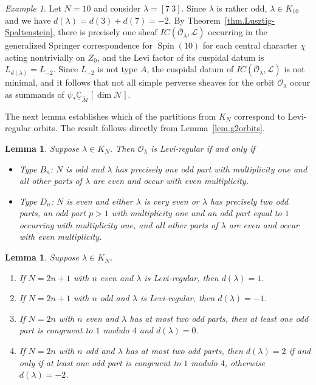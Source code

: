 \documentclass[reqno,11pt]{amsart}
\newtheorem{Lem}[Thm]{Lemma}
\theoremstyle{remark}
\theoremstyle{remark}
\newtheorem{example}[Thm]{Example}
\theoremstyle{definition}
\theoremstyle{definition}
\theoremstyle{definition}
\numberwithin{equation}{section}
\newcommand{\C}{\mathbb{C}}           %
\newcommand{\Spin}{\operatorname{Spin}}
\newcommand{\cl}{\mathcal{L}}
\newcommand{\cm}{\mathcal{M}}
\newcommand{\cn}{\mathcal{N}}
\newcommand{\co}{\mathcal{O}}
\newcommand{\shc}{\underline{\C}}
\renewcommand{\tilde}{\widetilde}
\begin{document}
\begin{example}\label{ex.Spin10} Let $N=10$ and consider $\lambda = [7 \ 3]$. Since $\lambda$ is rather odd, $\lambda\in K_{10}$ and we have $d(\lambda) = d(3)+d(7) = -2$. By Theorem~\ref{thm.Lusztig-Spaltenstein}, there is precisely one sheaf $IC(\overline{\co}_\lambda, \cl)$ occurring in the generalized Springer correspondence for $\Spin(10)$ for each central character $\chi$ acting nontrivially on $Z_0$, and the Levi factor of its cuspidal datum is $L_{d(\lambda)} =L_{-2}$. Since $L_{-2}$ is not type $A$, the cuspidal datum of $IC(\overline{\co}_\lambda, \cl)$ is not minimal, and it follows that not all simple perverse sheaves for the orbit $\co_\lambda$ occur as summands of $\psi_*\shc_{\tilde{\cm}}[\dim \cn]$. 
\end{example}



The next lemma establishes which of the partitions from $K_N$ correspond to Levi-regular orbits. The result follows directly from Lemma~\ref{lem.g2orbits}.

\begin{Lem}\label{Lem:partitionxn}
Suppose $\lambda\in K_N$. Then $\co_\lambda$ is Levi-regular if and only if 
\begin{itemize}
\item \textup{Type $B_n$:}  $N$ is odd and $\lambda$ has precisely one odd part with multiplicity one and all other parts of $\lambda$ are even and occur with even multiplicity.
\item \textup{Type $D_n$:}  $N$ is even and either $\lambda$ is very even or  $\lambda$ has precisely two odd parts, an odd part $p > 1$ with multiplicity one and an odd part equal to $1$ occurring with multiplicity one, and all other parts of $\lambda$ are even and occur with even multiplicity.
\end{itemize}
\end{Lem}



\begin{Lem}\label{lem.spinsoln}
Suppose $\lambda \in K_N$.  
\begin{enumerate}
\item If $N = 2n+1$ with $n$ even and $\lambda$ is Levi-regular, then $d(\lambda) = 1$.
\item If $N = 2n+1$ with $n$ odd and $\lambda$ is Levi-regular, then $d(\lambda) = -1$. 
\item If $N = 2n$ with $n$ even and $\lambda$ has at most two odd parts, then at least one odd part is congruent to $1$ modulo $4$ and  $d(\lambda) = 0$.
\item If $N = 2n$ with $n$ odd and $\lambda$ has at most two odd parts, then $d(\lambda) = 2$ if and only if at least one odd part is congruent to $1$ modulo $4$, otherwise $d(\lambda)=-2$. 
\end{enumerate}
\end{Lem}
\end{document}
